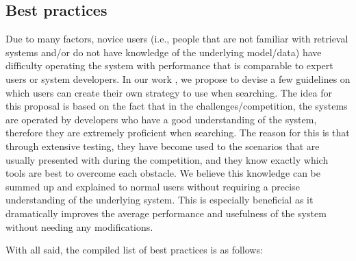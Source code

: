 \subsection{Best practices}
\label{sec:best_practices}

Due to many factors, novice users (i.e., people that are not familiar with retrieval systems and/or do not have knowledge of the underlying model/data) have difficulty operating the system with performance that is comparable to expert users or system developers. In our work , we propose to devise a few guidelines on which users can create their own strategy to use when searching. The idea for this proposal is based on the fact that in the challenges/competition, the systems are operated by developers who have a good understanding of the system, therefore they are extremely proficient when searching. The reason for this is that through extensive testing, they have become used to the scenarios that are usually presented with during the competition, and they know exactly which tools are best to overcome each obstacle. We believe this knowledge can be summed up and explained to normal users without requiring a precise understanding of the underlying system. This is especially beneficial as it dramatically improves the average performance and usefulness of the system without needing any modifications.

With all said, the compiled list of best practices is as follows:

